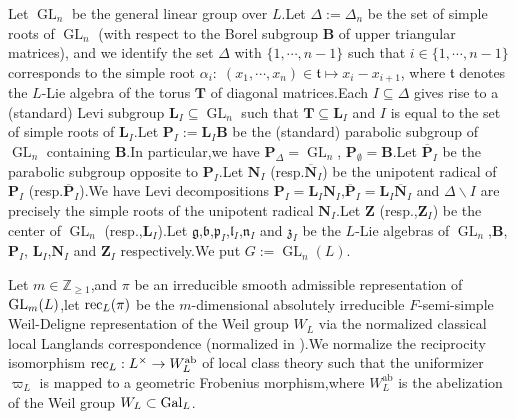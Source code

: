 \documentclass[10pt]{article}
\DeclareMathOperator{\GL}{GL}
\newcommand{\gal}{{\rm Gal}}
\newcommand{\GLN}{{\rm GL}}
\newcommand{\rec}{{\rm rec}_L}
\newcommand{\BZ}{{\mathbb{Z}}}
\newcommand{\bB}{{\mathbf{B}}}
\newcommand{\bL}{{\mathbf{L}}}
\newcommand{\bN}{{\mathbf{N}}}
\newcommand{\bP}{{\mathbf{P}}}
\newcommand{\bT}{{\mathbf{T}}}
\newcommand{\bZ}{{\mathbf{Z}}}
\newcommand{\fb}{{\mathfrak{b}}}
\newcommand{\fg}{{\mathfrak{g}}}
\newcommand{\fl}{{\mathfrak{l}}}
\newcommand{\fn}{{\mathfrak{n}}}
\newcommand{\fp}{{\mathfrak{p}}}
\newcommand{\ft}{{\mathfrak{t}}}
\newcommand{\fz}{{\mathfrak{z}}}
\begin{document}
Let $\GL_n$ be the general linear group over $L$.\;Let $\Delta:=\Delta_n$ be the set of simple roots of $\GL_n$ (with respect to the Borel subgroup $\bB$ of upper triangular matrices), and we identify the set $\Delta$ with $\{1,\cdots, n-1\}$ such that $i\in \{1,\cdots, n-1\}$ corresponds to the simple root $\alpha_{i}:\;(x_1,\cdots, x_n)\in \ft \mapsto x_{i}-x_{i+1}$, where $\ft$ denotes the $L$-Lie algebra of the torus $\bT$ of diagonal matrices.\;Each $I\subseteq \Delta$ gives rise to a (standard) Levi subgroup $\bL_I\subseteq \GL_n$ such that $\bT\subseteq \bL_I$ and $I$ is equal to the set of simple roots of $\mathbf{L}_{I}$.\;Let $\mathbf{P}_{I}:=\mathbf{L}_{I}\bB$ be the (standard) parabolic subgroup of
$\GL_n$ containing $\bB$.\;In particular,\;we have $\mathbf{P}_{\Delta}=\GL_n$, $\mathbf{P}_{\emptyset}=\mathbf{B}$.\;Let $\overline{\mathbf{P}}_{I}$ be the parabolic subgroup opposite to $\mathbf{P}_{I}$.\;Let $\bN_{I}$ (resp.\;$\overline{\bN}_{I}$) be the unipotent radical of $\bP_{I}$ (resp.\;$\overline{\bP}_{I}$).\;We have Levi decompositions $\bP_I=\bL_I\bN_I$,\;$\overline{\bP}_I=\bL_I\overline{\bN}_I$ and $\Delta \backslash  I$ are precisely the simple roots of the unipotent radical $\bN_{I}$.\;Let $\bZ$ (resp.,\;$\bZ_I$) be the center of $\GL_n$ (resp.,\;$\mathbf{L}_{I}$).\;Let $\fg$,\;$\fb$,\;$\fp_{I}$,\;$\fl_{I}$,\;$\fn_I$ and $\fz_I$ be the $L$-Lie algebras of $\GL_n$,\;$\bB$,\;$\mathbf{P}_{I}$, $\mathbf{L}_{I}$,\;$\bN_I$ and $\bZ_I$ respectively.\;We put $G:=\GL_n(L)$.\;



Let $m\in\BZ_{\geq 1}$,\;and $\pi$ be an irreducible smooth admissible representation of $\GLN_m(L)$,\;let $\rec(\pi)$ be the $m$-dimensional absolutely irreducible $F$-semi-simple Weil-Deligne representation of the Weil group $W_L$ via the normalized classical local Langlands correspondence (normalized in \cite{scholze2013local}).\;We normalize the reciprocity isomorphism $\rec:L^\times\rightarrow W_L^{\mathrm{ab}}$ of local class theory such that the uniformizer $\varpi_{L}$ is mapped to a geometric Frobenius morphism,\;where $W_L^{\mathrm{ab}}$ is the abelization of the Weil group $W_L\subset \gal_L$.\;
\end{document}

